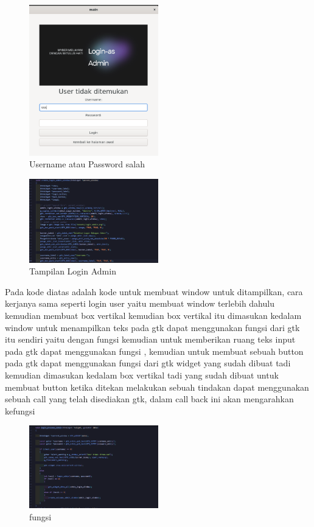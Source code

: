 \documentclass[a4paper,12pt]{article}
\begin{document}
\begin{figure}[!htbp]
    \centering
    \includegraphics[width=0.5\textwidth]{./img/login_admin/user_not_found.png}
    \caption{Username atau Password salah}
\end{figure}
\begin{figure}[!htbp]
    \centering
    \includegraphics[width=0.5\textwidth]{./img/login_admin/login_window.png}
    \caption{Tampilan Login Admin}
\end{figure}
\FloatBarrier
Pada kode diatas adalah kode untuk membuat window untuk ditampilkan, cara kerjanya sama seperti login user yaitu membuat 
window terlebih dahulu kemudian membuat box vertikal kemudian box vertikal itu dimasukan kedalam window
untuk menampilkan teks pada gtk dapat menggunakan fungsi dari gtk itu sendiri yaitu dengan fungsi \texttt{} kemudian
untuk memberikan ruang teks input pada gtk dapat menggunakan fungsi \texttt{}, kemudian untuk membuat sebuah button pada gtk dapat 
menggunakan fungsi \texttt{} dari gtk widget yang sudah dibuat tadi kemudian dimasukan kedalam box vertikal tadi yang sudah dibuat
untuk membuat button ketika ditekan melakukan sebuah tindakan dapat menggunakan sebuah call yang telah disediakan gtk, dalam call back ini akan mengarahkan
kefungsi \texttt{}
\begin{figure}[!htbp]
    \centering
    \includegraphics[width=0.5\textwidth]{./img/login_admin/login_proses.png}
    \caption{fungsi \texttt{}}
\end{figure}
\end{document}
